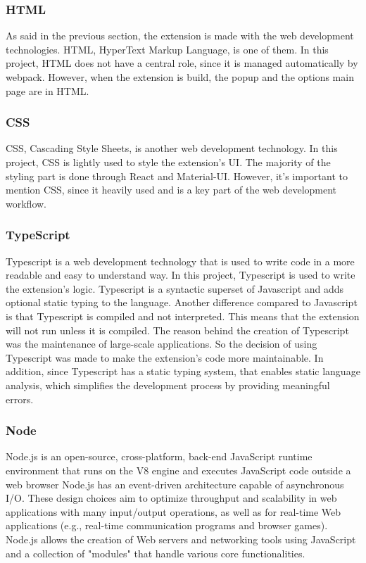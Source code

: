 \subsubsection {HTML}

As said in the previous section, the extension is made with the web development technologies. HTML, HyperText Markup Language, is one of them.
In this project, HTML does not have a central role, since it is managed automatically by webpack. However, when the extension is build, the popup and the options main page are in HTML.

\subsubsection {CSS}

CSS, Cascading Style Sheets, is another web development technology. In this project, CSS is lightly used to style the extension's UI. The majority of the styling part is done through React and Material-UI. However, it's important to mention CSS, since it heavily used and is a key part of the web development workflow.

\subsubsection {TypeScript}

Typescript is a web development technology that is used to write code in a more readable and easy to understand way. In this project, Typescript is used to write the extension's logic.
Typescript is a syntactic superset of Javascript and adds optional static typing to the language. Another difference compared to Javascript is that Typescript is compiled and not interpreted. This means that the extension will not run unless it is compiled. The reason behind the creation of Typescript was the maintenance of large-scale applications. So the decision of using Typescript was made to make the extension's code more maintainable.
In addition, since Typescript has a static typing system, that enables static language analysis, which simplifies the development process by providing meaningful errors.
\subsubsection {Node}

Node.js is an open-source, cross-platform, back-end JavaScript runtime environment that runs on the V8 engine and executes JavaScript code outside a web browser
Node.js has an event-driven architecture capable of asynchronous I/O. These design choices aim to optimize throughput and scalability in web applications with many input/output operations, as well as for real-time Web applications (e.g., real-time communication programs and browser games).
Node.js allows the creation of Web servers and networking tools using JavaScript and a collection of "modules" that handle various core functionalities.

